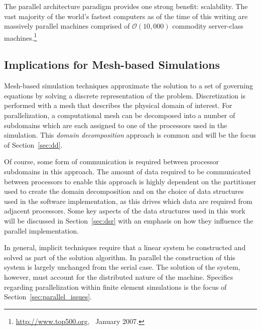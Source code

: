 The parallel architecture paradigm provides one strong benefit: scalability. The vast majority of the world's fastest computers as of the time of this writing are massively parallel machines comprised of $\mathcal{O}(10,000)$ commodity server-class machines.\footnote{\url{http://www.top500.org},\mbox{ } January 2007.}

\subsection{Implications for Mesh-based Simulations}
Mesh-based simulation techniques approximate the solution to a set of governing equations by solving a discrete representation of the problem.  Discretization is performed with a mesh that describes the physical domain of interest.  For parallelization, a computational mesh can be decomposed into a number of subdomains which are each assigned to one of the processors used in the simulation.  This \emph{domain decomposition} approach is common and will be the focus of Section~\ref{sec:dd}.

Of course, some form of communication is required between processor subdomains in this approach.  The amount of data required to be communicated between processors to enable this approach is highly dependent on the partitioner used to create the domain decomposition and on the choice of data structures used in the software implementation, as this drives which data are required from adjacent processors.  Some key aspects of the data structures used in this work will be discussed in Section~\ref{sec:dsr} with an emphasis on how they influence the parallel implementation.

In general, implicit techniques require that a linear system be constructed and solved as part of the solution algorithm.  In parallel the construction of this system is largely unchanged from the serial case.  The solution of the system, however, must account for the distributed nature of the machine.  Specifics regarding parallelization within finite element simulations is the focus of Section~\ref{sec:parallel_issues}.




